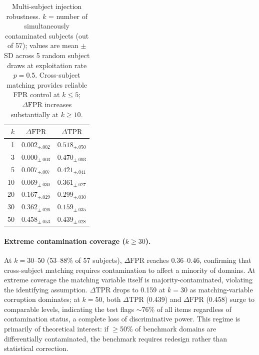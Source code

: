 \begin{table}[h]
\centering
\caption{Multi-subject injection robustness. $k$ = number of simultaneously contaminated subjects (out of 57); values are mean $\pm$ SD across 5 random subject draws at exploitation rate $p = 0.5$. Cross-subject matching provides reliable FPR control at $k \leq 5$; $\Delta\mathrm{FPR}$ increases substantially at $k \geq 10$.}
\label{tab:multi_subject_injection}
\small
\begin{tabular}{rcc}
\toprule
$k$ & $\Delta\mathrm{FPR}$ & $\Delta\mathrm{TPR}$ \\
\midrule
1 & $0.002_{\pm.002}$ & $0.518_{\pm.050}$ \\
3 & $0.000_{\pm.003}$ & $0.470_{\pm.093}$ \\
5 & $0.007_{\pm.007}$ & $0.421_{\pm.041}$ \\
10 & $0.069_{\pm.030}$ & $0.361_{\pm.027}$ \\
20 & $0.167_{\pm.029}$ & $0.299_{\pm.030}$ \\
30 & $0.362_{\pm.026}$ & $0.159_{\pm.035}$ \\
50 & $0.458_{\pm.053}$ & $0.439_{\pm.028}$ \\
\bottomrule
\end{tabular}
\end{table}

\paragraph{Extreme contamination coverage ($k \geq 30$).} At $k = 30$--$50$ (53--88\% of 57 subjects), $\Delta\mathrm{FPR}$ reaches 0.36--0.46, confirming that cross-subject matching requires contamination to affect a minority of domains. At extreme coverage the matching variable itself is majority-contaminated, violating the identifying assumption. $\Delta\mathrm{TPR}$ drops to 0.159 at $k{=}30$ as matching-variable corruption dominates; at $k{=}50$, both $\Delta\mathrm{TPR}$ (0.439) and $\Delta\mathrm{FPR}$ (0.458) surge to comparable levels, indicating the test flags ${\sim}$76\% of all items regardless of contamination status, a complete loss of discriminative power. This regime is primarily of theoretical interest: if ${\geq}$50\% of benchmark domains are differentially contaminated, the benchmark requires redesign rather than statistical correction.

